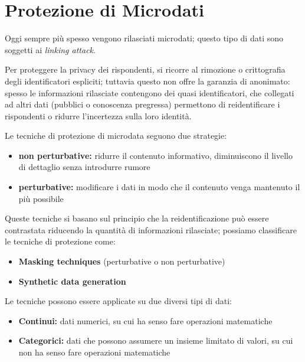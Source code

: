 \documentclass{report}
\begin{document}
\chapter{Protezione di Microdati}
Oggi sempre più spesso vengono rilasciati microdati; questo tipo di dati sono
soggetti ai \textit{linking attack}. 

Per proteggere la privacy dei rispondenti, si ricorre al rimozione o crittografia degli identificatori
espliciti; tuttavia questo non offre la garanzia di anonimato: spesso le informazioni 
rilasciate contengono dei quasi identificatori, che collegati ad altri dati (pubblici o
conoscenza pregressa) permettono di reidentificare i rispondenti o ridurre l'incertezza
sulla loro identità.

Le tecniche di protezione di microdata seguono due strategie:
\begin{itemize}
    \item \textbf{non perturbative:} ridurre il contenuto informativo, diminuiscono il livello di dettaglio senza introdurre rumore
    \item \textbf{perturbative:} modificare i dati in modo che il contenuto venga mantenuto il più possibile
\end{itemize}

\noindent Queste tecniche si basano sul principio che la reidentificazione può essere 
contrastata riducendo la quantità di informazioni rilasciate; possiamo classificare le
tecniche di protezione come:
\begin{itemize}
    \item \textbf{Masking techniques} (perturbative o non perturbative)
    \item \textbf{Synthetic data generation }
\end{itemize}

\noindent Le tecniche possono essere applicate su due diversi tipi di dati:
\begin{itemize}
    \item \textbf{Continui:} dati numerici, su cui ha senso fare operazioni matematiche
    \item \textbf{Categorici:} dati che possono assumere un insieme limitato di valori, su cui non ha senso fare operazioni matematiche
\end{itemize}

\newpage
\end{document}
